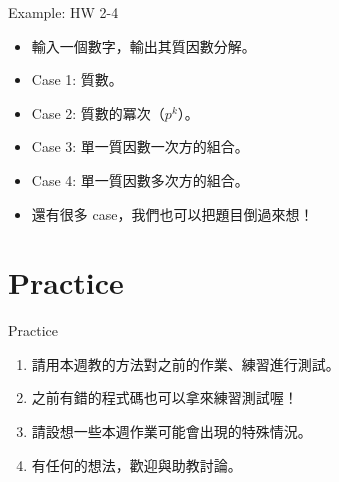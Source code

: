 \documentclass[t]{beamer}
\begin{document}
\begin{frame}{Example: HW 2-4}
  \begin{itemize}
    \item 輸入一個數字，輸出其質因數分解。
    \item Case 1: 質數。
    \item Case 2: 質數的冪次（$p^k$）。
    \item Case 3: 單一質因數一次方的組合。
    \item Case 4: 單一質因數多次方的組合。
    \item 還有很多 case，我們也可以把題目倒過來想！
  \end{itemize}
\end{frame}

\section{Practice}
\begin{frame}{Practice}
  \begin{enumerate}
    \item 請用本週教的方法對之前的作業、練習進行測試。
    \item 之前有錯的程式碼也可以拿來練習測試喔！
    \item 請設想一些本週作業可能會出現的特殊情況。
    \item 有任何的想法，歡迎與助教討論。
  \end{enumerate}
\end{frame}

\end{document}

